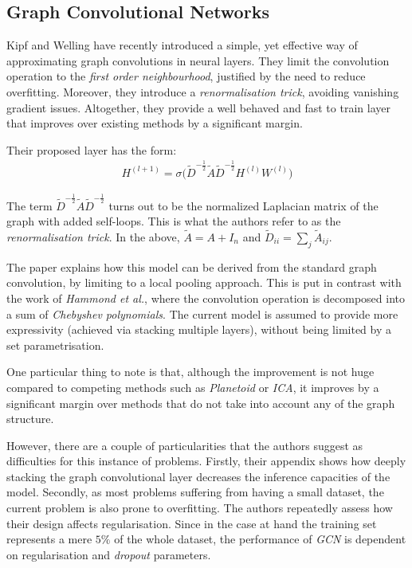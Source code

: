 \documentclass[10pt,a4]{article}
\begin{document}
    \subsection{Graph Convolutional Networks \cite{kipf2016semi}} 

    Kipf and Welling \cite{kipf2016semi} have recently introduced a simple, 
    yet effective way of approximating graph convolutions in neural layers. 
    They limit the convolution operation to the \emph{first order neighbourhood}, 
    justified by the need to reduce overfitting. Moreover, they introduce a 
    \emph{renormalisation trick}, avoiding vanishing gradient issues. 
    Altogether, they provide a well behaved and fast to train layer that improves 
    over existing methods by a significant margin.

    Their proposed layer has the form:
    \begin{align}
        \label{eqn:layer}
        H^{(l+1)} = \sigma \big( 
            \tilde{D}^{-\frac{1}{2}} 
            \tilde{A} 
            \tilde{D}^{-\frac{1}{2}} 
            H^{(l)}W^{(l)}
            \big)
    \end{align}

    The term $\tilde{D}^{-\frac{1}{2}} \tilde{A} \tilde{D}^{-\frac{1}{2}} $ turns out 
    to be the normalized Laplacian matrix \cite{hammond2011wavelets} of the graph 
    with added self-loops. This is what the authors refer to as the 
    \emph{renormalisation trick}. In the above, $\tilde{A} = A + I_n$ and 
    $\tilde{D}_{ii} = \sum_j\tilde{A}_{ij}$.

    The paper explains how this model can be derived from the standard graph convolution, 
    by limiting to a local pooling approach. This is put in 
    contrast with the work of \emph{Hammond et al.}\cite{hammond2011wavelets}, where 
    the convolution operation is decomposed into a sum of \emph{Chebyshev polynomials}.
    The current model is assumed to provide more expressivity (achieved via 
    stacking multiple layers), without being limited by a set parametrisation. 

    One particular thing to note is that, although the improvement is not huge 
    compared to competing methods such as \emph{Planetoid}\cite{yang2016revisiting} 
    or \emph{ICA}\cite{bhagat2011node}, it improves by a significant margin over 
    methods that do not take into account any of the graph structure. 

    However, there are a couple of particularities that the authors suggest as 
    difficulties for this instance of problems. Firstly, their appendix shows how 
    deeply stacking the graph convolutional layer decreases the inference capacities 
    of the model. 
    Secondly, as most problems suffering from having a small dataset, the 
    current problem is also prone to overfitting. The authors repeatedly assess 
    how their design affects regularisation. Since in the 
    case at hand the training set represents a mere $5\%$ of the whole dataset, 
    the performance of \emph{GCN} is dependent on 
    regularisation and \emph{dropout} \cite{srivastava2014dropout} parameters.
\end{document}
